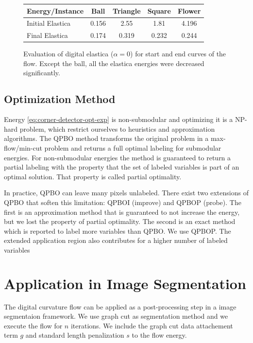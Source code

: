 \documentclass[runningheads]{llncs}
\begin{document}
\begin{figure}[!ht]
\center
\begin{tabular}{l|c|c|c|c}
	Energy/Instance & Ball & Triangle & Square & Flower\\
	\hline
	Initial Elastica & 0.156 & 2.55 & 1.81 & 4.196 \\
	Final Elastica & 0.174 & 0.319 & 0.232 & 0.244
\end{tabular}
\caption{Evaluation of digital elastica ($\alpha=0$) for start and end curves of the flow. Except the ball, all the elastica energies were decreased significantly.}
\label{tab:digital_glows_elastica_result}
\end{figure}

\subsection{Optimization Method}\label{sec:optimization_method}

	Energy \eqref{eq:corner-detector-opt-exp} is non-submodular and optimizing it is a NP-hard problem, which restrict ourselves to heuristics and approximation algorithms. The QPBO method \cite{kolmogorov07} transforms the original problem in a max-flow/min-cut problem and returns a full optimal labeling for submodular energies. For non-submodular energies the method is guaranteed to return a partial labeling with the property that the set of labeled variables is part of an optimal solution. That property is called partial optimality. 

	In practice, QPBO can leave many pixels unlabeled. There exist two extensions of QPBO that soften this limitation: QPBOI (improve) and QPBOP (probe). The first is an approximation method that is guaranteed to not increase the energy, but we lost the property of partial optimality. The second is an exact method which is reported to label more variables than QPBO. We use QPBOP. The extended application region also contributes for a higher number of labeled variables
	
\section{Application in Image Segmentation}

The digital curvature flow can be applied as a post-processing step in a image segmentaion framework. We use graph cut \cite{boykov01} as segmentation method and we execute the flow for $n$ iterations. We include the graph cut data attachement term $g$ and standard length penalization $s$ to the flow energy.
\end{document}
